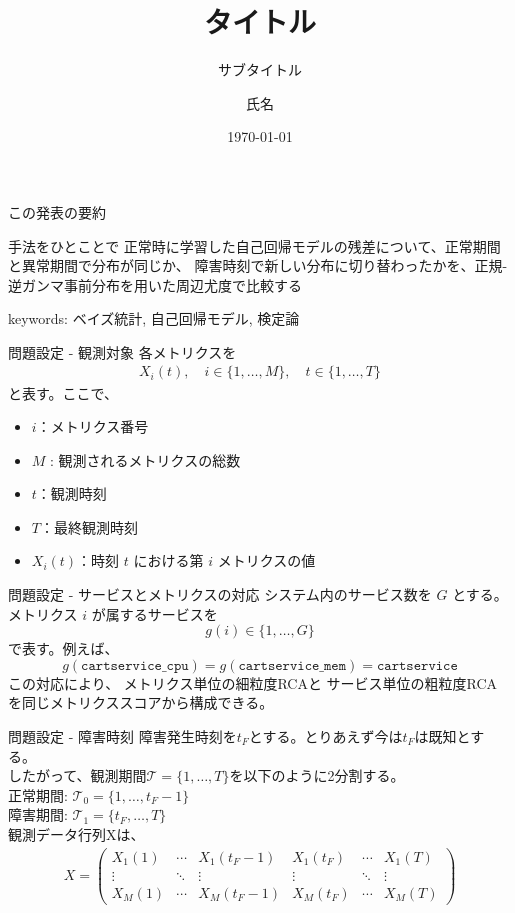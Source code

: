 \documentclass[dvipdfmx, 11pt, aspectratio=169, notheorems]{beamer}
\title[タイトル]{タイトル}
\subtitle{サブタイトル}
\author[氏名]{氏名}
\institute[早稲田大学]{早稲田大学 基幹理工学研究科 数学応用数理専攻\\清水研究室}
\date{\today}
\begin{document}
\begin{frame}
    \titlepage
\end{frame}

\begin{frame}{この発表の要約}
    \begin{block}{手法をひとことで}
        正常時に学習した自己回帰モデルの残差について、正常期間と異常期間で分布が同じか、
        障害時刻で新しい分布に切り替わったかを、正規-逆ガンマ事前分布を用いた周辺尤度で比較する
    \end{block}
    keywords: ベイズ統計, 自己回帰モデル, 検定論
\end{frame}

\begin{frame}{問題設定 - 観測対象}
    各メトリクスを
    \begin{align}
        X_i(t),\quad i\in\{1,\ldots,M\}, \quad t\in\{1,\ldots,T\}
    \end{align}
    と表す。ここで、
    \begin{itemize}
        \item \(i\)：メトリクス番号
        \item \(M\) : 観測されるメトリクスの総数
        \item \(t\)：観測時刻
        \item \(T\)：最終観測時刻
        \item  \(X_i(t)\)：時刻 \(t\) における第 \(i\) メトリクスの値
    \end{itemize}
\end{frame}

\begin{frame}{問題設定 - サービスとメトリクスの対応}
    システム内のサービス数を \(G\) とする。
    メトリクス \(i\) が属するサービスを\[g(i)\in\{1,\ldots,G\}\]で表す。例えば、
\[g(\texttt{cartservice\_cpu})
=g(\texttt{cartservice\_mem})
=\texttt{cartservice}\]
この対応により、
メトリクス単位の細粒度RCAと
サービス単位の粗粒度RCA
を同じメトリクススコアから構成できる。
\end{frame}

\begin{frame}{問題設定 - 障害時刻}
    障害発生時刻を$t_F$とする。とりあえず今は$t_F$は既知とする。\\
    したがって、観測期間$\mathcal{T} = \{1, \ldots, T\}$を以下のように2分割する。\\
    正常期間: $\mathcal{T}_0 = \{1, \ldots, t_F-1\} $ \\
    障害期間: $\mathcal{T}_1 = \{t_F, \ldots, T\} $ \\
    \vspace{12pt}
    観測データ行列Xは、
    \begin{align}
        X = \begin{pmatrix}
            X_1(1) & \cdots & X_1(t_F -1) & X_1(t_F) & \cdots & X_1(T)\\
            \vdots & \ddots & \vdots & \vdots & \ddots & \vdots\\
            X_M(1) & \cdots & X_M(t_F -1) & X_M(t_F) & \cdots & X_M(T)
        \end{pmatrix}
    \end{align}
\end{frame}
\end{document}
